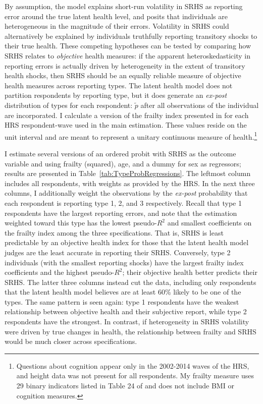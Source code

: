 \documentclass[12pt,pdftex,letterpaper]{article}
\newcommand{\TypeProb}{p}
\newcommand{\TypeProbPcvd}{\widetilde{\TypeProb}}
\newcommand{\RootDir}{..}
\newcommand{\TablesDir}{\RootDir/Tables}
\begin{document}
By assumption, the model explains short-run volatility in SRHS as reporting error around the true latent health level, and posits that individuals are heterogeneous in the magnitude of their errors. Volatility in SRHS could alternatively be explained by individuals truthfully reporting transitory shocks to their true health. These competing hypotheses can be tested by comparing how SRHS relates to \textit{objective} health measures: if the apparent heteroskedasticity in reporting errors is actually driven by heterogeneity in the extent of transitory health shocks, then SRHS should be an equally reliable measure of objective health measures across reporting types. The latent health model does not partition respondents by reporting type, but it does generate an \textit{ex-post} distribution of types for each respondent: $\TypeProbPcvd$ after all observations of the individual are incorporated. I calculate a version of the frailty index presented in \cite{HosseiniZhao21a} for each HRS respondent-wave used in the main estimation. These values reside on the unit interval and are meant to represent a unitary continuous measure of health.\footnote{Questions about cognition appear only in the 2002-2014 waves of the HRS, and height data was not present for all respondents. My frailty measure uses 29 binary indicators listed in Table 24 of \cite{HosseiniZhao21a} and does not include BMI or cognition measures.}



I estimate several versions of an ordered probit with SRHS as the outcome variable and using frailty (squared), age, and a dummy for sex as regressors; results are presented in Table~\ref{tab:TypeProbRegressions}. The leftmost column includes all respondents, with weights as provided by the HRS. In the next three columns, I additionally weight the observations by the \textit{ex-post} probability that each respondent is reporting type 1, 2, and 3 respectively. Recall that type 1 respondents have the largest reporting errors, and note that the estimation weighted toward this type has the lowest pseudo-$R^2$ and smallest coefficients on the frailty index among the three specifications. That is, SRHS is least predictable by an objective health index for those that the latent health model judges are the least accurate in reporting their SRHS. Conversely, type 2 individuals (with the smallest reporting shocks) have the largest frailty index coefficients and the highest pseudo-$R^2$; their objective health better predicts their SRHS. The latter three columns instead cut the data, including only respondents that the latent health model believes are at least 60\% likely to be one of the types. The same pattern is seen again: type 1 respondents have the weakest relationship between objective health and their subjective report, while type 2 respondents have the strongest. In contrast, if heterogeneity in SRHS volatility were driven by true changes in health, the relationship between frailty and SRHS would be much closer across specifications.
\end{document}
